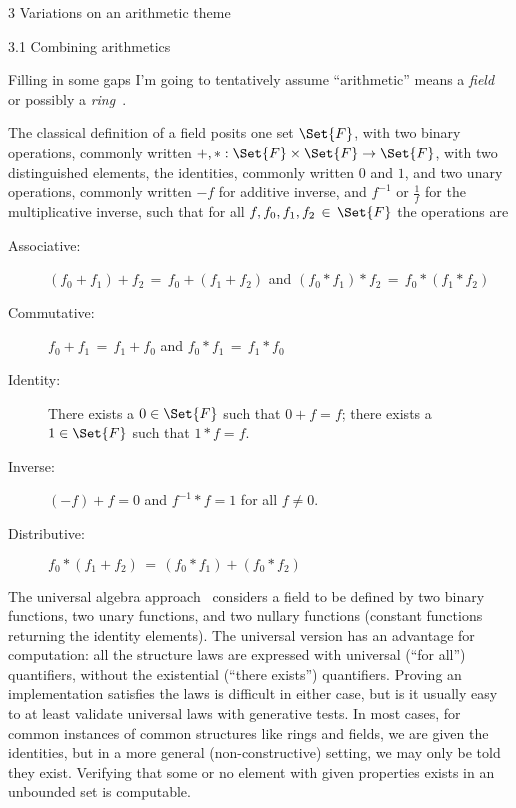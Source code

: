 \documentclass[12pt]{PalisadesLakesBook}
\begin{document}
\begin{plSection}{3 Variations on an arithmetic theme}
\begin{plSection}{3.1 Combining arithmetics}
\begin{plSection}{Filling in some gaps}
I'm going to tentatively assume ``arithmetic'' means
a \emph{field}~\cite{wiki:FieldMathematics}
or possibly a \emph{ring}~\cite{wiki:RingMathematics}.

The classical definition of a field posits
one set $\Set{F}$,
with two binary operations, commonly written
$+, * : \Set{F} \times \Set{F} \rightarrow \Set{F}$, 
with two distinguished elements, the identities,
commonly written $0$ and $1$,
and two unary operations, commonly written 
$-f$ for additive inverse, and $f^{-1}$ or $\frac{1}{f}$
for the multiplicative inverse,
such that for all 
$f, f_{0}, f_{1}, f_{2} \, \in \, \Set{F}$
the operations are
\begin{description}

\item[Associative:] 
$\left( f_{0} + f_{1} \right) + f_{2} 
\,=\, 
f_{0} + \left( f_{1} + f_{2} \right)$
and 
$\left( f_{0} * f_{1} \right) * f_{2} 
\,=\, 
f_{0} * \left( f_{1} * f_{2} \right)$

\item[Commutative:] 
$f_{0} + f_{1} \,=\, f_{1} + f_{0}$
and 
$f_{0} * f_{1} \,=\, f_{1} * f_{0}$

\item[Identity:] There exists a $0 \in \Set{F}$ such that
$0 + f = f$;
there exists a $1 \in \Set{F}$ such that $1 * f = f$.

\item[Inverse:] $\left(-f\right) + f = 0$
and $f^{-1}*f = 1$ for all $f\neq0$.

\item[Distributive:] 
$f_{0} * \left( f_{1} + f_{2} \right)
\,=\, 
\left(f_{0} * f_{1} \right) + \left(f_{0} * f_{2} \right)$

\end{description}

\NOTE The universal algebra approach~\cite{wiki:UniversalAlgebra} considers a field
to be defined by two binary functions, two unary functions,
and two nullary functions (constant functions returning the
identity elements).
The universal version has an advantage for computation:
all the structure laws are expressed with universal (``for all'')
quantifiers, without the existential (``there exists'')
quantifiers.
Proving an implementation satisfies the laws is difficult 
in either case, but is it usually easy to at least validate
universal laws with generative tests.
In most cases, for common instances of common structures
like rings and fields, we are given the identities,
but in a more general (non-constructive) setting, 
we may only be told they exist.
Verifying that some or no element with given properties exists
in an unbounded set is computable.


\end{plSection}
\end{plSection}
\end{plSection}
\end{document}
